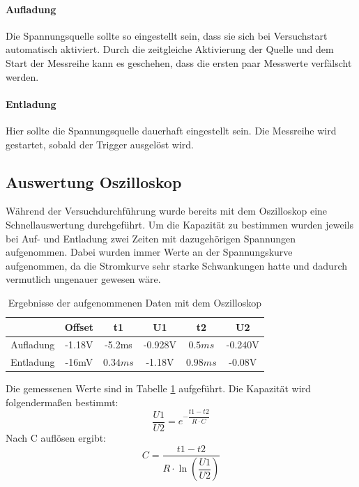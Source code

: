 \documentclass[12pt,a4paper]{article}
\begin{document}
\paragraph{Aufladung}
Die Spannungsquelle sollte so eingestellt sein, dass sie sich bei Versuchstart automatisch aktiviert. Durch die zeitgleiche Aktivierung der Quelle und dem Start der Messreihe kann es geschehen, dass die ersten paar Messwerte verfälscht werden.
\paragraph{Entladung}
Hier sollte die Spannungsquelle dauerhaft eingestellt sein. Die Messreihe wird gestartet, sobald der Trigger ausgelöst wird.
\newpage
\subsection{Auswertung Oszilloskop}
Während der Versuchdurchführung wurde bereits mit dem Oszilloskop eine Schnellauswertung durchgeführt.
Um die Kapazität zu bestimmen wurden jeweils bei Auf- und Entladung zwei Zeiten mit dazugehörigen Spannungen aufgenommen. Dabei wurden immer Werte an der Spannungskurve aufgenommen, da die Stromkurve sehr starke Schwankungen hatte und dadurch vermutlich ungenauer gewesen wäre.\\
\begin{table}[H]
\begin{center}
\begin{tabular}{|c|c|c|c|c|c|}
\hline 
 & Offset & t1 & U1 & t2 & U2 \\ 
\hline 
Aufladung & -1.18V & -5.2ms & -0.928V & $0.5ms$ & -0.240V \\ 
\hline 
Entladung & -16mV & $0.34ms$ & -1.18V & $0.98ms$ & -0.08V \\ 
\hline 
\end{tabular} 
\end{center}
\label{tab:Kond_Osz}
\caption{Ergebnisse der aufgenommenen Daten mit dem Oszilloskop}
\end{table}
Die gemessenen Werte sind in Tabelle \ref{tab:Kond_Osz} aufgeführt. Die Kapazität wird folgendermaßen bestimmt:
\begin{equation}
\dfrac{U1}{U2} = e^{-\dfrac{t1-t2}{R\cdot C}}
\end{equation}
Nach C auflösen ergibt:
\begin{equation}
C = \dfrac{t1-t2}{R\cdot \ln(\dfrac{U1}{U2})}
\end{equation}
\end{document}
